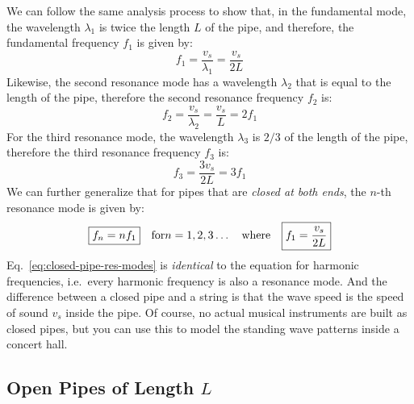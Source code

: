 We can follow the same analysis process to show that, in the fundamental mode,
the wavelength $\lambda_1$ is twice the length $L$ of the pipe, and therefore,
the fundamental frequency $f_1$ is given by:
\begin{equation*}
  f_1=\frac{v_s}{\lambda_1}=\frac{v_s}{2L}
\end{equation*}
Likewise, the second resonance mode has a wavelength $\lambda_2$ that is equal
to the length of the pipe, therefore the second resonance frequency $f_2$ is:
\begin{equation*}
  f_2=\frac{v_s}{\lambda_2}=\frac{v_s}L=2f_1
\end{equation*}
For the third resonance mode, the wavelength $\lambda_3$ is $2/3$ of the length
of the pipe, therefore the third resonance frequency $f_3$ is:
\begin{equation*}
  f_3=\frac{3v_s}{2L}=3f_1
\end{equation*}
We can further generalize that for pipes that are \emph{closed at both ends},
the $n$-th resonance mode is given by:
\begin{equation}
  \boxed{f_n=nf_1}
  \quad\text{for} n=1,2,3\ldots
  \quad\text{\normalsize where}\quad
  \boxed{f_1=\frac{v_s}{2L}}
  \label{eq:closed-pipe-res-modes}
\end{equation}
Eq.~\ref{eq:closed-pipe-res-modes} is \emph{identical} to the equation for
harmonic frequencies, i.e.\ every harmonic frequency is also a resonance mode.
And the
difference between a closed pipe and a string is that the wave speed is the
speed of sound $v_s$ inside the pipe. Of course, no actual musical instruments
are built as closed pipes, but you can use this to model the standing wave
patterns inside a concert hall.



\subsection{Open Pipes of Length $L$}

